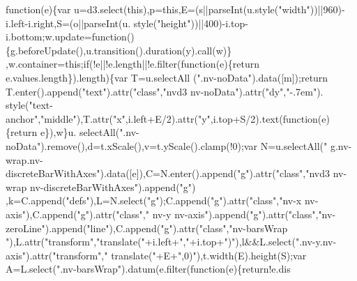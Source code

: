 \begin{DoxyCode}
{      function}(e)\{var u=d3.select(\textcolor{keyword}{this}),p=\textcolor{keyword}{this},E=(s||parseInt(u.style(\textcolor{stringliteral}{"width"}))||960)-i.left-i.right,S=(o||parseInt(u.
      style(\textcolor{stringliteral}{"height"}))||400)-i.top-i.bottom;w.update=\textcolor{keyword}{function}()\{g.beforeUpdate(),u.transition().duration(y).call(w)\}
      ,w.container=\textcolor{keyword}{this};\textcolor{keywordflow}{if}(!e||!e.length||!e.filter(\textcolor{keyword}{function}(e)\{return e.values.length\}).length)\{var T=u.selectAll
      (\textcolor{stringliteral}{".nv-noData"}).data([m]);\textcolor{keywordflow}{return} T.enter().append(\textcolor{stringliteral}{"text"}).attr(\textcolor{stringliteral}{"class"},\textcolor{stringliteral}{"nvd3 nv-noData"}).attr(\textcolor{stringliteral}{"dy"},\textcolor{stringliteral}{"-.7em"}).
      style(\textcolor{stringliteral}{"text-anchor"},\textcolor{stringliteral}{"middle"}),T.attr(\textcolor{stringliteral}{"x"},i.left+E/2).attr(\textcolor{stringliteral}{"y"},i.top+S/2).text(\textcolor{keyword}{function}(e)\{\textcolor{keywordflow}{return} e\}),w\}u.
      selectAll(\textcolor{stringliteral}{".nv-noData"}).remove(),d=t.xScale(),v=t.yScale().clamp(!0);var N=u.selectAll(\textcolor{stringliteral}{"
      g.nv-wrap.nv-discreteBarWithAxes"}).data([e]),C=N.enter().append(\textcolor{stringliteral}{"g"}).attr(\textcolor{stringliteral}{"class"},\textcolor{stringliteral}{"nvd3 nv-wrap nv-discreteBarWithAxes"}).append(\textcolor{stringliteral}{"g"})
      ,k=C.append(\textcolor{stringliteral}{"defs"}),L=N.select(\textcolor{stringliteral}{"g"});C.append(\textcolor{stringliteral}{"g"}).attr(\textcolor{stringliteral}{"class"},\textcolor{stringliteral}{"nv-x nv-axis"}),C.append(\textcolor{stringliteral}{"g"}).attr(\textcolor{stringliteral}{"class"},\textcolor{stringliteral}{"
      nv-y nv-axis"}).append(\textcolor{stringliteral}{"g"}).attr(\textcolor{stringliteral}{"class"},\textcolor{stringliteral}{"nv-zeroLine"}).append(\textcolor{stringliteral}{"line"}),C.append(\textcolor{stringliteral}{"g"}).attr(\textcolor{stringliteral}{"class"},\textcolor{stringliteral}{"nv-barsWrap
      "}),L.attr(\textcolor{stringliteral}{"transform"},\textcolor{stringliteral}{"translate("}+i.left+\textcolor{stringliteral}{","}+i.top+\textcolor{stringliteral}{")"}),l&&L.select(\textcolor{stringliteral}{".nv-y.nv-axis"}).attr(\textcolor{stringliteral}{"transform"},\textcolor{stringliteral}{"
      translate("}+E+\textcolor{stringliteral}{",0)"}),t.width(E).height(S);var A=L.select(\textcolor{stringliteral}{".nv-barsWrap"}).datum(e.filter(\textcolor{keyword}{function}(e)\{return!e.dis

\end{DoxyCode}

